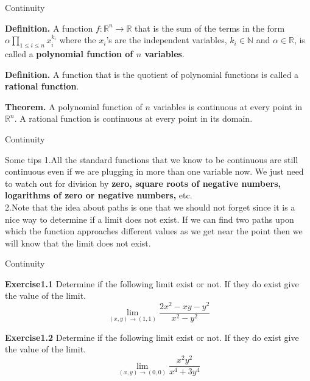 \documentclass[aspectratio=169, UTF8]{ctexbeamer}
\begin{document}
    \begin{frame}[t]{Continuity}
        \begin{block}
            \par \textbf{Definition.} A function $f: \mathbb{R}^n \to \mathbb{R}$ that is the sum of the terms in the form $\alpha \prod_{1 \leq i \leq n} x_i^{k_i}$ where the $x_i$'s are the independent variables, $k_i \in \mathbb{N}$ and $\alpha \in \mathbb{R}$, is called a \textbf{polynomial function of $n$ variables}.

            \par \textbf{Definition.} A function that is the quotient of polynomial functions is called a \textbf{rational function}.
        \end{block}

        \begin{block}
            \par \textbf{Theorem.} A polynomial function of $n$ variables is continuous at every point in $\mathbb{R}^n$. A rational function is continuous at every point in its domain.
        \end{block}
    \end{frame}
    
    
    \begin{frame}[t]{Continuity}
        \begin{block}{Some tips}
            1.All the standard functions that we know to be continuous are still continuous even if we are plugging in more than one variable now. We just need to watch out for division by \textbf{zero, square roots of negative numbers, logarithms of zero or negative numbers,} etc.\\
            2.Note that the idea about paths is one that we should not forget since it is a nice way to determine if a limit does not exist. If we can find two paths upon which the function approaches different values as we get near the point then we will know that the limit does not exist.
        \end{block}
        
    \end{frame}
    
    \begin{frame}{Continuity}
        \par\textbf{Exercise1.1} Determine if the following limit exist or not. If they do exist give the value of the limit.
        \begin{equation*}
            \lim_{(x,y)\to(1,1)}\frac{2x^2-xy-y^2}{x^2-y^2}
        \end{equation*}
        \par\textbf{Exercise1.2} Determine if the following limit exist or not. If they do exist give the value of the limit.
        \begin{equation*}
            \lim_{(x,y)\to(0,0)}\frac{x^2y^2}{x^4+3y^4}
        \end{equation*}
    \end{frame}
\end{document}
